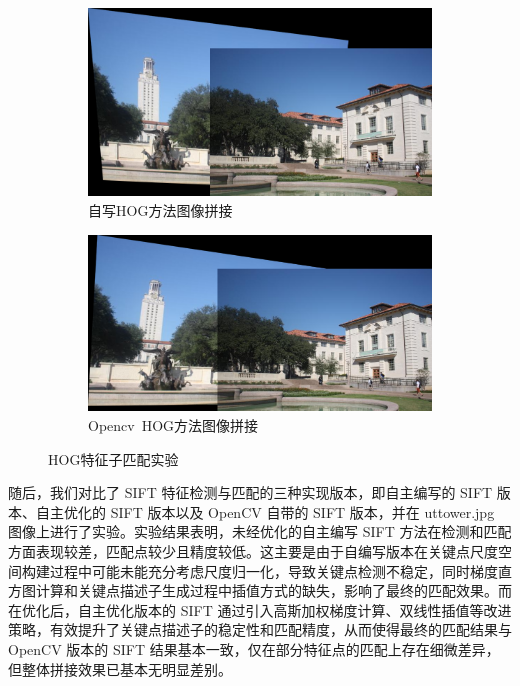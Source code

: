 \documentclass[a4paper, utf8]{ctexart}
\begin{document}
\begin{figure}[htbp]
		\begin{subfigure}{.45\textwidth}
			\centering
			\includegraphics[height=.13\textheight]{./figure/uttower_handon_stitching_hog.png}
			\caption{自写HOG方法图像拼接}
		\end{subfigure}
		\begin{subfigure}{.45\textwidth}
			\centering
			\includegraphics[height=.13\textheight]{./figure/uttower_opencv_stitching_hog.png}
			\caption{Opencv\ HOG方法图像拼接}
		\end{subfigure}
		\caption{HOG特征子匹配实验}
	\end{figure}

	随后，我们对比了 SIFT 特征检测与匹配的三种实现版本，即自主编写的 SIFT 版本、自主优化的 SIFT 版本以及 OpenCV 自带的 SIFT 版本，并在 uttower.jpg 图像上进行了实验。实验结果表明，未经优化的自主编写 SIFT 方法在检测和匹配方面表现较差，匹配点较少且精度较低。这主要是由于自编写版本在关键点尺度空间构建过程中可能未能充分考虑尺度归一化，导致关键点检测不稳定，同时梯度直方图计算和关键点描述子生成过程中插值方式的缺失，影响了最终的匹配效果。而在优化后，自主优化版本的 SIFT 通过引入高斯加权梯度计算、双线性插值等改进策略，有效提升了关键点描述子的稳定性和匹配精度，从而使得最终的匹配结果与 OpenCV 版本的 SIFT 结果基本一致，仅在部分特征点的匹配上存在细微差异，但整体拼接效果已基本无明显差别。
	
\end{document}

